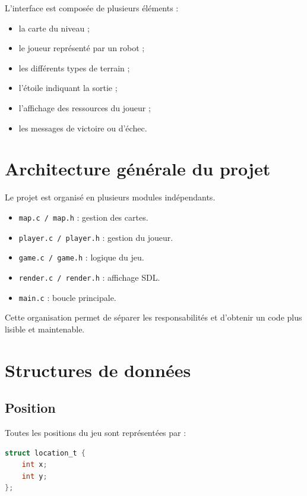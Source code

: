 \documentclass[a4paper,11pt]{article}
\begin{document}
L'interface est composée de plusieurs éléments :

\begin{itemize}
    \item la carte du niveau ;
    \item le joueur représenté par un robot ;
    \item les différents types de terrain ;
    \item l'étoile indiquant la sortie ;
    \item l'affichage des ressources du joueur ;
    \item les messages de victoire ou d'échec.
\end{itemize}


\section{Architecture générale du projet}

Le projet est organisé en plusieurs modules indépendants.

\begin{itemize}
    \item \texttt{map.c / map.h} : gestion des cartes.
    \item \texttt{player.c / player.h} : gestion du joueur.
    \item \texttt{game.c / game.h} : logique du jeu.
    \item \texttt{render.c / render.h} : affichage SDL.
    \item \texttt{main.c} : boucle principale.
\end{itemize}

Cette organisation permet de séparer les responsabilités et d'obtenir un code plus lisible et maintenable.

\section{Structures de données}

\subsection{Position}

Toutes les positions du jeu sont représentées par :

\begin{lstlisting}[language=C]
struct location_t {
    int x;
    int y;
};
\end{lstlisting}
\end{document}
